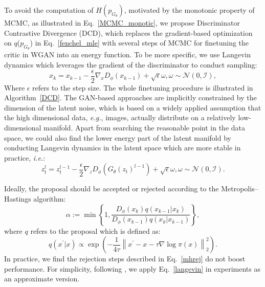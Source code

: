 \documentclass{article}
\begin{document}
To avoid the computation of $H(p_{G_\theta})$, motivated by the monotonic property of MCMC, as illustrated in Eq.~\ref{MCMC_monotic}, we propose Discriminator Contrastive Divergence (DCD), which replaces the gradient-based optimization on $q$($p_{G_\theta}$) in Eq.~\ref{fenchel_mle} with several steps of MCMC for finetuning the critic in WGAN into an energy function. To be more specific, we use Langevin dynamics\cite{teh2003energy} which leverages the gradient of the discriminator to conduct sampling:
\begin{equation}
\label{langevin}
x_{k}=x_{k-1}-\frac{\epsilon}{2} \nabla_{x} D_{\phi}\left(x_{k-1}\right)+\sqrt{\epsilon}\omega, \omega \sim \mathcal{N}(0, \mathcal{I}),
\end{equation}
Where $\epsilon$ refers to the step size. The whole finetuning procedure is illustrated in Algorithm~\ref{DCD}. 
The GAN-based approaches are implicitly constrained by the  dimension of the latent noise, which is based on a widely applied assumption that the high dimensional data, \emph{e.g.}, images, actually distribute on a relatively low-dimensional manifold. Apart from searching the reasonable point in the data space, we could also find the lower energy part of the latent manifold by conducting Langevin dynamics in the latent space which are more stable in practice, \emph{i.e.}:
\begin{equation}
\label{langevin_Z}
z_t^l = z_t^{l-1} -\frac{\epsilon}{2} \nabla_{z} D_{\phi}\left(G_\theta(z_t)^{l-1}\right)+\sqrt{\epsilon}\omega, \omega \sim \mathcal{N}(0, \mathcal{I}).
\end{equation}

Ideally, the proposal should be accepted or rejected according to the Metropolis–Hastings algorithm:
\begin{equation}
\label{mhrej}
\alpha:=\min \left\{1, \frac{D_\phi \left(x_{k}\right) q\left(x_{k-1} | x_{k}\right)}{D_\phi \left(x_{k-1}\right) q\left(x_{k} | x_{k-1}\right)}\right\},
\end{equation}
where $q$ refers to the proposal which is defined as:
\begin{equation}
q\left(x^{\prime} | x\right) \propto \exp \left(-\frac{1}{4 \tau}\left\|x^{\prime}-x-\tau \nabla \log \pi(x)\right\|_{2}^{2}\right).
\end{equation}
In practice, we find the rejection steps described in Eq.~\ref{mhrej} do not boost performance. For simplicity, following \cite{song2019generative,du2019implicit}, we apply Eq.~\ref{langevin} in experiments as an approximate version. 
\end{document}

